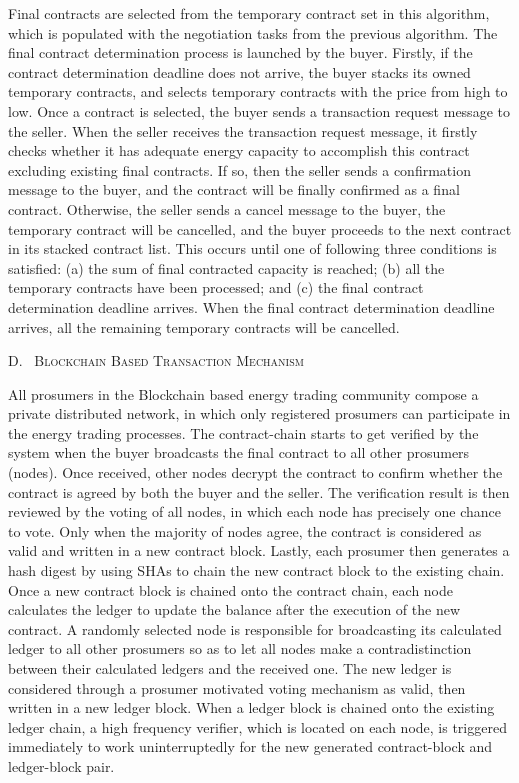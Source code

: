 \documentclass[
]{article}
\begin{document}
Final contracts are selected from the temporary contract set in this
algorithm, which is populated with the negotiation tasks from the
previous algorithm. The final contract determination process is launched
by the buyer. Firstly, if the contract determination deadline does not
arrive, the buyer stacks its owned temporary contracts, and selects
temporary contracts with the price from high to low. Once a contract is
selected, the buyer sends a transaction request message to the seller.
When the seller receives the transaction request message, it firstly
checks whether it has adequate energy capacity to accomplish this
contract excluding existing final contracts. If so, then the seller
sends a confirmation message to the buyer, and the contract will be
finally confirmed as a final contract. Otherwise, the seller sends a
cancel message to the buyer, the temporary contract will be cancelled,
and the buyer proceeds to the next contract in its stacked contract
list. This occurs until one of following three conditions is satisfied:
(a) the sum of final contracted capacity is reached; (b) all the
temporary contracts have been processed; and (c) the final contract
determination deadline arrives. When the final contract determination
deadline arrives, all the remaining temporary contracts will be
cancelled.

D.~ \textsc{Blockchain Based Transaction Mechanism}

All prosumers in the Blockchain based energy trading community compose a
private distributed network, in which only registered prosumers can
participate in the energy trading processes. The contract-chain starts
to get verified by the system when the buyer broadcasts the final
contract to all other prosumers (nodes). Once received, other nodes
decrypt the contract to confirm whether the contract is agreed by both
the buyer and the seller. The verification result is then reviewed by
the voting of all nodes, in which each node has precisely one chance to
vote. Only when the majority of nodes agree, the contract is considered
as valid and written in a new contract block. Lastly, each prosumer then
generates a hash digest by using SHAs to chain the new contract block to
the existing chain. Once a new contract block is chained onto the
contract chain, each node calculates the ledger to update the balance
after the execution of the new contract. A randomly selected node is
responsible for broadcasting its calculated ledger to all other
prosumers so as to let all nodes make a contradistinction between their
calculated ledgers and the received one. The new ledger is considered
through a prosumer motivated voting mechanism as valid, then written in
a new ledger block. When a ledger block is chained onto the existing
ledger chain, a high frequency verifier, which is located on each node,
is triggered immediately to work uninterruptedly for the new generated
contract-block and ledger-block pair.
\end{document}
